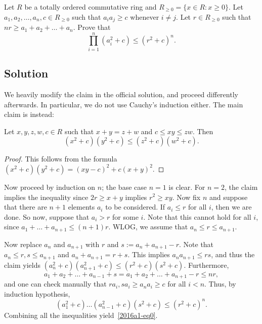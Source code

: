Let $R$ be a totally ordered commutative ring and $R_{\geq 0} = \{x \in R : x \geq 0\}$.
Let $a_1, a_2, \ldots, a_n, c \in R_{\geq 0}$ such that $a_i a_j \geq c$ whenever $i \neq j$.
Let $r \in R_{\geq 0}$ such that $nr \geq a_1 + a_2 + \ldots + a_n$.
Prove that
\[ \prod_{i = 1}^n (a_i^2 + c) \leq (r^2 + c)^n. \tag{*}\label{2016a1-eq0} \]



\subsection*{Solution}

We heavily modify the claim in the official solution, and proceed differently afterwards.
In particular, we do not use Cauchy's induction either.
The main claim is instead:

\begin{claim}
Let $x, y, z, w, c \in R$ such that $x + y = z + w$ and $c \leq xy \leq zw$.
Then \[ (x^2 + c)(y^2 + c) \leq (z^2 + c)(w^2 + c). \]
\end{claim}
\begin{proof}
This follows from the formula $(x^2 + c)(y^2 + c) = (xy - c)^2 + c(x + y)^2$.
\end{proof}

Now proceed by induction on $n$; the base case $n = 1$ is clear.
For $n = 2$, the claim implies the inequality since $2r \geq x + y$ implies $r^2 \geq xy$.
Now fix $n$ and suppose that there are $n + 1$ elements $a_i$ to be considered.
If $a_i \leq r$ for all $i$, then we are done.
So now, suppose that $a_i > r$ for some $i$.
Note that this cannot hold for all $i$, since $a_1 + \ldots + a_{n + 1} \leq (n + 1)r$.
WLOG, we assume that $a_n \leq r \leq a_{n + 1}$.

Now replace $a_n$ and $a_{n + 1}$ with $r$ and $s := a_n + a_{n + 1} - r$.
Note that $a_n \leq r, s \leq a_{n + 1}$ and $a_n + a_{n + 1} = r + s$.
This implies $a_n a_{n + 1} \leq rs$, and thus the claim yields $(a_n^2 + c)(a_{n + 1}^2 + c) \leq (r^2 + c)(s^2 + c)$.
Furthermore,
\[ a_1 + a_2 + \ldots + a_{n - 1} + s = a_1 + a_2 + \ldots + a_{n + 1} - r \leq nr, \]
    and one can check manually that $r a_i, s a_i \geq a_n a_i \geq c$ for all $i < n$.
Thus, by induction hypothesis,
\[ (a_1^2 + c) \ldots (a_{n - 1}^2 + c) (s^2 + c) \leq (r^2 + c)^n. \]
Combining all the inequalities yield~\eqref{2016a1-eq0}.

